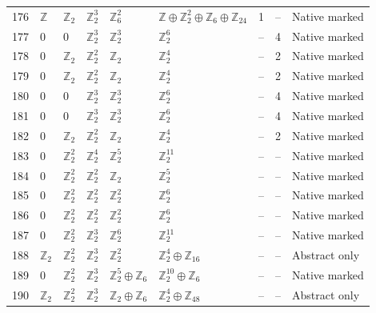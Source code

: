 \documentclass[10pt]{article}
\begin{document}
\begin{longtable}{r|lllll|rrl}
176 & $\mathbb{Z}$ & $\mathbb{Z}_{2}$ & $\mathbb{Z}_{2}^{3}$ & $\mathbb{Z}_{6}^{2}$ & $\mathbb{Z}\oplus \mathbb{Z}_{2}^{2}\oplus \mathbb{Z}_{6}\oplus \mathbb{Z}_{24}$ & 1 & -- & Native marked\\
177 & $0$ & $0$ & $\mathbb{Z}_{2}^{3}$ & $\mathbb{Z}_{2}^{3}$ & $\mathbb{Z}_{2}^{6}$ & -- & 4 & Native marked\\
178 & $0$ & $\mathbb{Z}_{2}$ & $\mathbb{Z}_{2}^{2}$ & $\mathbb{Z}_{2}$ & $\mathbb{Z}_{2}^{4}$ & -- & 2 & Native marked\\
179 & $0$ & $\mathbb{Z}_{2}$ & $\mathbb{Z}_{2}^{2}$ & $\mathbb{Z}_{2}$ & $\mathbb{Z}_{2}^{4}$ & -- & 2 & Native marked\\
180 & $0$ & $0$ & $\mathbb{Z}_{2}^{3}$ & $\mathbb{Z}_{2}^{3}$ & $\mathbb{Z}_{2}^{6}$ & -- & 4 & Native marked\\
181 & $0$ & $0$ & $\mathbb{Z}_{2}^{3}$ & $\mathbb{Z}_{2}^{3}$ & $\mathbb{Z}_{2}^{6}$ & -- & 4 & Native marked\\
182 & $0$ & $\mathbb{Z}_{2}$ & $\mathbb{Z}_{2}^{2}$ & $\mathbb{Z}_{2}$ & $\mathbb{Z}_{2}^{4}$ & -- & 2 & Native marked\\
183 & $0$ & $\mathbb{Z}_{2}^{2}$ & $\mathbb{Z}_{2}^{4}$ & $\mathbb{Z}_{2}^{5}$ & $\mathbb{Z}_{2}^{11}$ & -- & -- & Native marked\\
184 & $0$ & $\mathbb{Z}_{2}^{2}$ & $\mathbb{Z}_{2}^{2}$ & $\mathbb{Z}_{2}$ & $\mathbb{Z}_{2}^{5}$ & -- & -- & Native marked\\
185 & $0$ & $\mathbb{Z}_{2}^{2}$ & $\mathbb{Z}_{2}^{2}$ & $\mathbb{Z}_{2}^{2}$ & $\mathbb{Z}_{2}^{6}$ & -- & -- & Native marked\\
186 & $0$ & $\mathbb{Z}_{2}^{2}$ & $\mathbb{Z}_{2}^{2}$ & $\mathbb{Z}_{2}^{2}$ & $\mathbb{Z}_{2}^{6}$ & -- & -- & Native marked\\
187 & $0$ & $\mathbb{Z}_{2}^{2}$ & $\mathbb{Z}_{2}^{3}$ & $\mathbb{Z}_{2}^{6}$ & $\mathbb{Z}_{2}^{11}$ & -- & -- & Native marked\\
188 & $\mathbb{Z}_{2}$ & $\mathbb{Z}_{2}^{2}$ & $\mathbb{Z}_{2}^{3}$ & $\mathbb{Z}_{2}^{2}$ & $\mathbb{Z}_{2}^{4}\oplus \mathbb{Z}_{16}$ & -- & -- & Abstract only\\
189 & $0$ & $\mathbb{Z}_{2}^{2}$ & $\mathbb{Z}_{2}^{3}$ & $\mathbb{Z}_{2}^{5}\oplus \mathbb{Z}_{6}$ & $\mathbb{Z}_{2}^{10}\oplus \mathbb{Z}_{6}$ & -- & -- & Native marked\\
190 & $\mathbb{Z}_{2}$ & $\mathbb{Z}_{2}^{2}$ & $\mathbb{Z}_{2}^{3}$ & $\mathbb{Z}_{2}\oplus \mathbb{Z}_{6}$ & $\mathbb{Z}_{2}^{4}\oplus \mathbb{Z}_{48}$ & -- & -- & Abstract only\\

\end{longtable}
\end{document}
